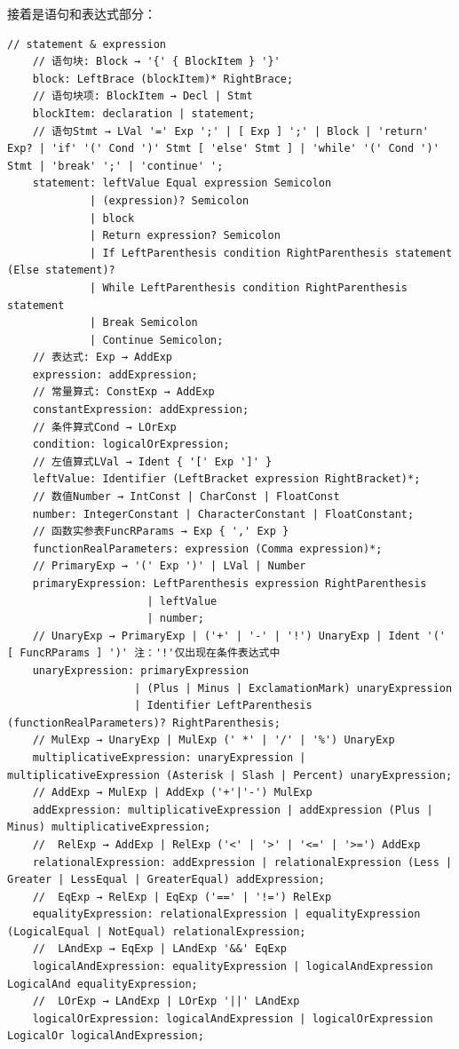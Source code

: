 \documentclass[UTF8]{report}
\begin{document}
接着是语句和表达式部分：

\begin{lstlisting}[language=antlr]
    // statement & expression
    // 语句块: Block → '{' { BlockItem } '}'
    block: LeftBrace (blockItem)* RightBrace;
    // 语句块项: BlockItem → Decl | Stmt
    blockItem: declaration | statement;
    // 语句Stmt → LVal '=' Exp ';' | [ Exp ] ';' | Block | 'return' Exp? | 'if' '(' Cond ')' Stmt [ 'else' Stmt ] | 'while' '(' Cond ')' Stmt | 'break' ';' | 'continue' ';
    statement: leftValue Equal expression Semicolon
             | (expression)? Semicolon
             | block
             | Return expression? Semicolon
             | If LeftParenthesis condition RightParenthesis statement (Else statement)?
             | While LeftParenthesis condition RightParenthesis statement
             | Break Semicolon
             | Continue Semicolon;
    // 表达式: Exp → AddExp
    expression: addExpression;
    // 常量算式: ConstExp → AddExp
    constantExpression: addExpression;
    // 条件算式Cond → LOrExp
    condition: logicalOrExpression;
    // 左值算式LVal → Ident { '[' Exp ']' }
    leftValue: Identifier (LeftBracket expression RightBracket)*;
    // 数值Number → IntConst | CharConst | FloatConst
    number: IntegerConstant | CharacterConstant | FloatConstant;
    // 函数实参表FuncRParams → Exp { ',' Exp }
    functionRealParameters: expression (Comma expression)*;
    // PrimaryExp → '(' Exp ')' | LVal | Number
    primaryExpression: LeftParenthesis expression RightParenthesis
                      | leftValue
                      | number;
    // UnaryExp → PrimaryExp | ('+' | '-' | '!') UnaryExp | Ident '(' [ FuncRParams ] ')' 注：'!'仅出现在条件表达式中
    unaryExpression: primaryExpression
                    | (Plus | Minus | ExclamationMark) unaryExpression
                    | Identifier LeftParenthesis (functionRealParameters)? RightParenthesis;
    // MulExp → UnaryExp | MulExp (' *' | '/' | '%') UnaryExp
    multiplicativeExpression: unaryExpression | multiplicativeExpression (Asterisk | Slash | Percent) unaryExpression;
    // AddExp → MulExp | AddExp ('+'|'-') MulExp
    addExpression: multiplicativeExpression | addExpression (Plus | Minus) multiplicativeExpression;
    //  RelExp → AddExp | RelExp ('<' | '>' | '<=' | '>=') AddExp
    relationalExpression: addExpression | relationalExpression (Less | Greater | LessEqual | GreaterEqual) addExpression;
    //  EqExp → RelExp | EqExp ('==' | '!=') RelExp
    equalityExpression: relationalExpression | equalityExpression (LogicalEqual | NotEqual) relationalExpression;
    //  LAndExp → EqExp | LAndExp '&&' EqExp
    logicalAndExpression: equalityExpression | logicalAndExpression LogicalAnd equalityExpression;
    //  LOrExp → LAndExp | LOrExp '||' LAndExp
    logicalOrExpression: logicalAndExpression | logicalOrExpression LogicalOr logicalAndExpression;
\end{lstlisting}
\end{document}
